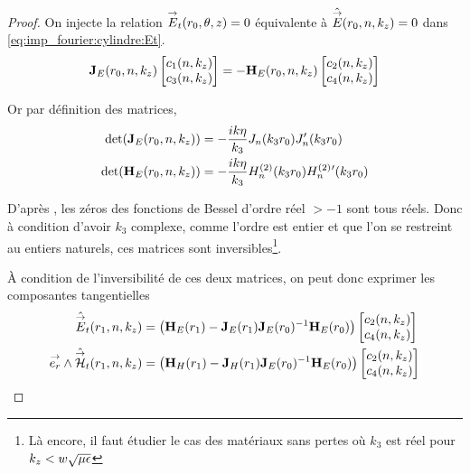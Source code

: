     \begin{proof}

      On injecte la relation \({\overset{\rightarrow}{E}}_t(r_0,\theta,z) = 0\) équivalente à \(\hat {{\overset{\rightarrow}{E}}}(r_0,n,k_z) = 0\) dans \eqref{eq:imp_fourier:cylindre:Et}.
      \begin{equation}
        \mathbf{J}_{E}(r_0,n,k_z)
        \begin{bmatrix}
          c_1(n,k_z) \\
          c_3(n,k_z)
        \end{bmatrix}
        =-\mathbf{H}_{E}(r_0,n,k_z)
        \begin{bmatrix}
          c_2(n,k_z) \\
          c_4(n,k_z)
        \end{bmatrix}
      \end{equation}

      Or par définition des matrices,
      \begin{align}
        \det(\mathbf{J}_E(r_0,n,k_z)) &= -\dfrac{ik\eta}{k_3}J_n(k_3r_0)J_n'(k_3r_0)
        \\
        \det(\mathbf{H}_E(r_0,n,k_z)) &= -\dfrac{ik\eta}{k_3}H_n^{(2)}(k_3r_0)H_n^{(2)}{}'(k_3r_0)
      \end{align}

      D’après \cite[p.~370]{abramowitz_handbook_1964}, les zéros des fonctions de Bessel d'ordre réel \(>-1\) sont tous réels.
      Donc à condition d'avoir \(k_3\) complexe, comme l'ordre est entier et que l'on se restreint au entiers naturels, ces matrices sont inversibles\footnote{Là encore, il faut étudier le cas des matériaux sans pertes où \(k_3\) est réel pour \(k_z < w\sqrt{\mu\epsilon}\)}.

      À condition de l'inversibilité de ces deux matrices, on peut donc exprimer les composantes tangentielles
      \begin{align}
        \hat {{\overset{\rightarrow}{E}}}_t(r_1,n,k_z) &=
        \left(\mathbf{H}_{E}(r_1) - \mathbf{J}_{E}(r_1)\mathbf{J}_{E}(r_0)^{-1}\mathbf{H}_{E}(r_0)\right)
        \begin{bmatrix}
          c_2(n,k_z) \\
          c_4(n,k_z)
        \end{bmatrix}
        \\
        {\overset{\rightarrow}{e_r}}\wedge \hat {{\overset{\rightarrow}{\mathcal{H}}}}_t(r_1,n,k_z) &=
        \left(\mathbf{H}_{H}(r_1) - \mathbf{J}_{H}(r_1)\mathbf{J}_{E}(r_0)^{-1}\mathbf{H}_{E}(r_0) \right)
        \begin{bmatrix}
          c_2(n,k_z) \\
          c_4(n,k_z)
        \end{bmatrix}
      \end{align}


\end{proof}
